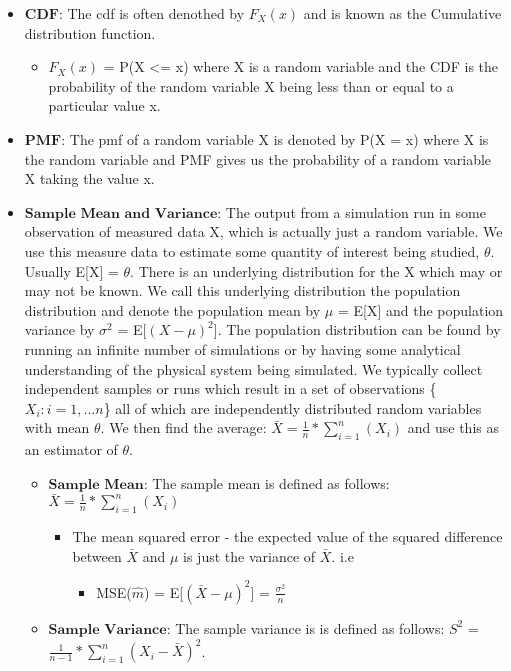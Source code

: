 \documentclass[11pt]{article}
\providecommand{\tightlist}{%
      \setlength{\itemsep}{0pt}\setlength{\parskip}{0pt}}
\begin{document}
\begin{itemize}
\item
  \(\textbf{CDF}\): The cdf is often denothed by \(F_{X}(x)\) and is
  known as the Cumulative distribution function.

  \begin{itemize}
  \tightlist
  \item
    \(F_{X}(x)\) = P(X \textless{}= x) where X is a random variable and
    the CDF is the probability of the random variable X being less than
    or equal to a particular value x.
  \end{itemize}
\item
  \(\textbf{PMF}\): The pmf of a random variable X is denoted by P(X =
  x) where X is the random variable and PMF gives us the probability of
  a random variable X taking the value x.
\item
  \(\textbf{Sample Mean and Variance}\): The output from a simulation
  run in some observation of measured data X, which is actually just a
  random variable. We use this measure data to estimate some quantity of
  interest being studied, \(\theta\). Usually E{[}X{]} = \(\theta\).
  There is an underlying distribution for the X which may or may not be
  known. We call this underlying distribution the population
  distribution and denote the population mean by \(\mu\) = E{[}X{]} and
  the population variance by \(\sigma^2\) = E{[}\((X - \mu)^2\){]}. The
  population distribution can be found by running an infinite number of
  simulations or by having some analytical understanding of the physical
  system being simulated. We typically collect independent samples or
  runs which result in a set of observations \{\(X_i : i = 1,...n\)\}
  all of which are independently distributed random variables with mean
  \(\theta\). We then find the average:
  \(\bar{X} = \frac{1}{n} * \sum_{i=1}^{n} (X_i)\) and use this as an
  estimator of \(\theta\).

  \begin{itemize}
  \item
    \(\textbf{Sample Mean}\): The sample mean is defined as follows:
    \(\bar{X} = \frac{1}{n} * \sum_{i=1}^{n} (X_i)\)

    \begin{itemize}
    \item
      The mean squared error - the expected value of the squared
      difference between \(\bar{X}\) and \(\mu\) is just the variance of
      \(\bar{X}\). i.e

      \begin{itemize}
      \tightlist
      \item
        MSE(\(\hat{m}\)) = E{[}\((\bar{X} - \mu)^2\){]} =
        \(\frac{\sigma^2}{n}\)
      \end{itemize}
    \end{itemize}
  \item
    \(\textbf{Sample Variance}\): The sample variance is is defined as
    follows: \(S^2\) =
    \(\frac{1}{n-1} * \sum_{i=1}^{n} (X_i - \bar{X})^2\).


\end{itemize}
\end{itemize}
\end{document}
